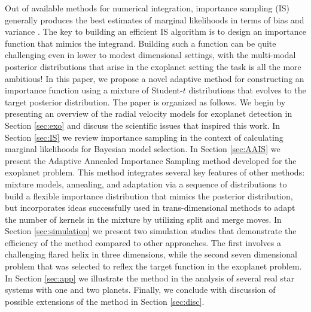 Out of available methods for numerical integration,
importance sampling (IS) generally produces the best estimates of
marginal likelihoods in terms of bias and variance \citep{Christian's
  comparisons?}. The key to building an efficient IS algorithm is to
design an importance function that mimics the integrand.  Building
such a function can be quite challenging even in lower to modest
dimensional settings, with the multi-modal posterior distributions
that arise in the exoplanet setting the task is all the more
ambitious!  In this paper, we propose a novel adaptive method for constructing an
importance function using a mixture of Student-$t$ distributions that
evolves to the target posterior distribution.  The paper is organized
as follows.  We begin by presenting an overview of the radial velocity
models for exoplanet detection in Section
\ref{sec:exo} and discuss the scientific issues that inspired this
work. In Section \ref{sec:IS} we review importance sampling in the
context of calculating marginal likelihoods for Bayesian model
selection. In Section \ref{sec:AAIS} we present the Adaptive Annealed
Importance Sampling method developed for the exoplanet problem. This
method integrates several key features of other methods: mixture
models, annealing, and adaptation via a sequence of distributions to
build a flexible importance distribution that mimics the posterior
distribution, but incorporates ideas successfully used in
trans-dimensional methods to adapt the number of kernels in the
mixture by utilizing split and merge moves.  In Section
\ref{sec:simulation} we present two simulation studies that
demonstrate the efficiency of the method compared to other approaches.
The first involves a challenging flared helix in three dimensions,
while the second seven dimensional problem that was selected to reflex
the target function in the exoplanet problem.  In Section
\ref{sec:app} we illustrate the method in the analysis of several real
star systems with one and two planets. Finally, we conclude with
discussion of possible extensions of the method in Section
\ref{sec:disc}.
